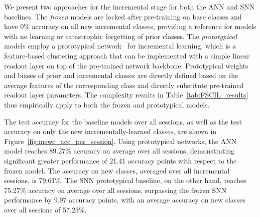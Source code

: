 
    We present two approaches for the incremental stage for both the ANN and SNN baselines. The \textit{frozen} models are locked after pre-training on base classes and have 0\% accuracy on all new incremental classes, providing a reference for models with no learning or catastrophic forgetting of prior classes. The \textit{prototypical} models employ a prototypical network~\cite{snell2017prototypical} for incremental learning, which is a feature-based clustering approach that can be implemented with a simple linear readout layer on top of the pre-trained network backbone. Prototypical weights and biases of prior and incremental classes are directly defined based on the average features of the corresponding class and directly substitute pre-trained readout layer parameters.  The complexity results in Table~\ref{tab:FSCIL_results} thus empirically apply to both the frozen and prototypical models.
    
    The test accuracy for the baseline models over all sessions, as well as the test accuracy on only the new incrementally-learned classes, are shown in Figure~\ref{fig:mswc_acc_per_session}.
    Using prototypical networks, the ANN model reaches 89.27\% accuracy on average over all sessions, demonstrating significant greater performance of 21.41 accuracy points with respect to the frozen model. The accuracy on new classes, averaged over all incremental sessions, is 79.61\%.
    The SNN prototypical baseline, on the other hand, reaches 75.27\% accuracy on average over all sessions, surpassing the frozen SNN performance by 9.97 accuracy points, with an average accuracy on new classes over all sessions of 57.23\%. 

